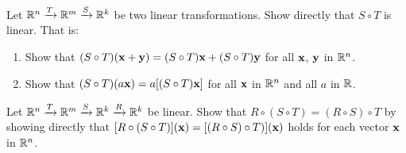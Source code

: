 \begin{multicols}{2}
\begin{ex}
\begin{sol}
\begin{enumerate}[label={\alph*.}]
\end{enumerate}
\end{sol}
\end{ex}

\begin{ex}
Let $\mathbb{R}^n \xrightarrow{T} \mathbb{R}^m \xrightarrow{S} \mathbb{R}^k$ be two linear transformations. Show directly that $S \circ T$ is linear. That is:

\begin{enumerate}[label={\alph*.}]
\item Show that $(S \circ T)(\textbf{x} + \textbf{y}) = (S \circ T)\textbf{x} + (S \circ T)\textbf{y}$ for all $\textbf{x}$, $\textbf{y}$ in $\mathbb{R}^n$.

\item Show that $(S \circ T)(a\textbf{x}) = a[(S \circ T)\textbf{x}]$ for all $\textbf{x}$ in $\mathbb{R}^n$ and all $a$ in $\mathbb{R}$.

\end{enumerate}
\end{ex}

\begin{ex}
Let $\mathbb{R}^n \xrightarrow{T} \mathbb{R}^m \xrightarrow{S} \mathbb{R}^k \xrightarrow{R} \mathbb{R}^k$ be linear. Show that $R \circ (S \circ T) = (R \circ S) \circ T$ by showing directly that $[R \circ (S \circ T)](\textbf{x}) = [(R \circ S) \circ T)](\textbf{x})$ holds for each vector $\textbf{x}$ in $\mathbb{R}^n$.
\end{ex}

\end{multicols}
